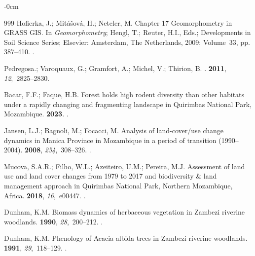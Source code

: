 \documentclass[coasts,article,accept,pdftex,oneauthor]{Definitions/mdpi}
\begin{document}
\begin{adjustwidth}{-\extralength}{0cm}
\begin{thebibliography}{999}
Hofierka, J.; Mitášová, H.; Neteler, M.
\newblock Chapter 17 Geomorphometry in GRASS GIS. In {\em Geomorphometry};
  Hengl, T.; Reuter, H.I., Eds.; Developments in
  Soil Science Series; Elsevier: Amsterdam, The Netherlands, 2009; Volume~33, pp. 387--410. %
.

Pedregosa.; Varoquaux, G.; Gramfort, A.; Michel, V.; Thirion, B.
.
 {\bf 2011}, {\em
  12},~2825--2830.

Bacar, F.F.; Faque, H.B.
\newblock Forest holds high rodent diversity than other habitats under a
  rapidly changing and fragmenting landscape in Quirimbas National Park,
  Mozambique.
 {\bf 2023}.
.

Jansen, L.J.; Bagnoli, M.; Focacci, M.
\newblock Analysis of land-cover/use change dynamics in Manica Province in
  Mozambique in a period of transition (1990–2004).
 {\bf 2008}, {\em 254},~308--326.
.

Mucova, S.A.R.; Filho, W.L.; Azeiteiro, U.M.; Pereira, M.J.
\newblock Assessment of land use and land cover changes from 1979 to 2017 and
  biodiversity \& land management approach in Quirimbas National Park, Northern
  Mozambique, Africa.
 {\bf 2018}, {\em 16},~e00447.
.

Dunham, K.M.
\newblock Biomass dynamics of herbaceous vegetation in Zambezi riverine
  woodlands.
 {\bf 1990}, {\em 28},~200--212.
.

Dunham, K.M.
\newblock Phenology of Acacia albida trees in Zambezi riverine woodlands.
 {\bf 1991}, {\em 29},~118--129.
.


\end{thebibliography}
\end{adjustwidth}
\end{document}
